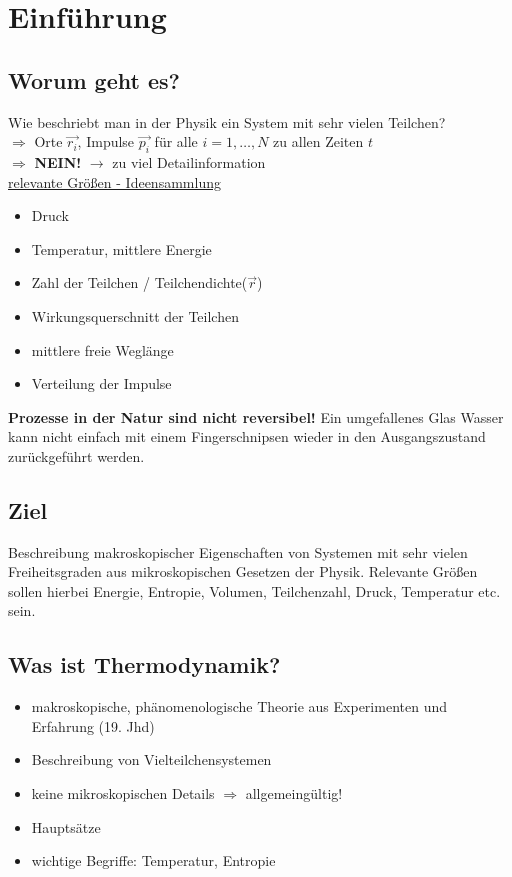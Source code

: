 \section{Einführung}     

\subsection*{Worum geht es?}

Wie beschriebt man in der Physik ein System mit sehr vielen Teilchen? \\
\hspace*{20mm} $\Rightarrow$ Orte $\Vec{r_i}$, Impulse $\Vec{p_i}$ für alle $i = 1, \dots , N$ zu allen Zeiten $t$ \\
\hspace*{20mm} $\Rightarrow$ \textbf{NEIN!} $\rightarrow$ zu viel Detailinformation\\

\underline{relevante Größen - Ideensammlung}
\begin{itemize}
    \item Druck
    \item Temperatur, mittlere Energie
    \item Zahl der Teilchen / Teilchendichte($\Vec{r}$)
    \item Wirkungsquerschnitt der Teilchen
    \item mittlere freie Weglänge
    \item Verteilung der Impulse
\end{itemize}

\textbf{Prozesse in der Natur sind nicht reversibel!} Ein umgefallenes Glas Wasser kann nicht einfach mit einem Fingerschnipsen wieder in den Ausgangszustand zurückgeführt werden.

\subsection*{Ziel}
Beschreibung makroskopischer Eigenschaften von Systemen mit sehr vielen Freiheitsgraden aus mikroskopischen Gesetzen der Physik. Relevante Größen sollen hierbei Energie, Entropie, Volumen, Teilchenzahl, Druck, Temperatur etc. sein.

\subsection{Was ist Thermodynamik?}
\begin{itemize}
    \item makroskopische, phänomenologische Theorie aus Experimenten und Erfahrung (19. Jhd)
    \item Beschreibung von Vielteilchensystemen
    \item keine mikroskopischen Details $\Rightarrow$ allgemeingültig!
    \item Hauptsätze
    \item wichtige Begriffe: Temperatur, Entropie
\end{itemize}


